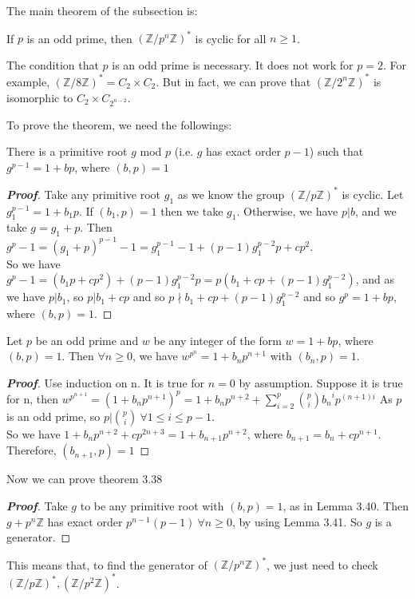 The main theorem of the subsection is:
\begin{theorem} If $p$ is an odd prime, then $(\mathbb{Z}/p^n\mathbb{Z})^*$ is cyclic for all $n \ge 1$.
\end{theorem}
\begin{remark} The condition that $p$ is an odd prime is necessary. It does not work for $p=2$. For example, $(\mathbb{Z}/8\mathbb{Z})^* = C_2 \times C_2$. But in fact, we can prove that $(\mathbb{Z}/2^n\mathbb{Z})^*$ is isomorphic to $C_2 \times C_{2^{n-2}}$.
\end{remark}
To prove the theorem, we need the followings:
\begin{lemma} There is a primitive root $g$ mod $p$ (i.e. $g$ has exact order $p-1$) such that $g^{p-1}=1+bp$, where $(b,p)=1$
\end{lemma}
\begin{proof}[\bf Proof] Take any primitive root $g_1$ as we know the group $(\mathbb{Z}/p\mathbb{Z})^*$ is cyclic.
Let $g_1^{p-1}=1+b_1p$. If $(b_1,p)=1$ then we take $g_1$. Otherwise, we have $p|b$, and we take $g=g_1+p$. Then $g^p -1 = (g_1+p)^{p-1}-1 = g_1^{p-1}-1 + (p-1)g_1^{p-2}p+cp^2$.\\

So we have $g^p-1 = (b_1p+cp^2)+(p-1)g_1^{p-2}p = p(b_1+cp+(p-1)g_1^{p-2})$, and as we have $p|b_1$, so $p|b_1+cp$ and so $p \nmid b_1+cp+(p-1)g_1^{p-2}$ and so $g^p=1+bp$, where $(b,p)=1$.
\end{proof}
\begin{lemma} Let $p$ be an odd prime and $w$ be any integer of the form $w=1+bp$, where $(b,p)=1$. Then $\forall n \ge 0$, we have $w^{p^n}=1+b_np^{n+1}$ with $(b_n,p)=1$.
\end{lemma}
\begin{proof}[\bf Proof] Use induction on n. It is true for $n=0$ by assumption. Suppose it is true for n, then
$w^{p^{n+1}}=(1+b_np^{n+1})^p=1+b_np^{n+2}+\sum_{i=2}^p \binom{p}{i}{b_n}^i p^{(n+1)i}$
As $p$ is an odd prime, so $p|\binom{p}{i}~\forall 1 \le i \le p-1$.\\

So we have $1+b_np^{n+2}+cp^{2n+3} = 1+b_{n+1}p^{n+2}$, where $b_{n+1}=b_n+cp^{n+1}$. Therefore, $(b_{n+1},p)=1$
\end{proof}
Now we can prove theorem 3.38
\begin{proof}[\bf Proof] Take $g$ to be any primitive root with $(b,p)=1$, as in Lemma 3.40. Then $g+p^n\mathbb{Z}$ has exact order $p^{n-1}(p-1)~\forall n \ge 0$, by using Lemma 3.41. So $g$ is a generator.
\end{proof}
\begin{remark} This means that, to find the generator of $(\mathbb{Z}/p^n\mathbb{Z})^*$, we just need to check $(\mathbb{Z}/p\mathbb{Z})^*, (\mathbb{Z}/p^2\mathbb{Z})^*$.
\end{remark}
~\\

